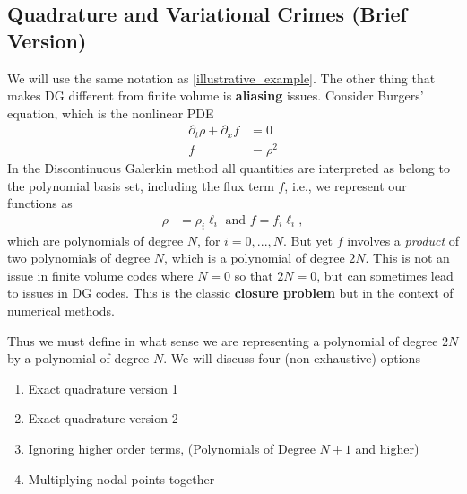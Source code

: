 \documentclass{report}
\numberwithin{equation}{section}
\begin{document}
\subsection{Quadrature and Variational Crimes (Brief Version)}
\label{aliasing_section}
We will use the same notation as \ref{illustrative_example}. The other thing that makes DG different from finite volume is \textbf{aliasing} issues.
Consider Burgers' equation, which is the nonlinear PDE
\begin{align}
    \partial_t \rho + \partial_x f &= 0 \\
    f &= \rho^2
\end{align}
In the Discontinuous Galerkin method all quantities are interpreted as belong to the polynomial basis set, including the flux term $f$, i.e., we represent our functions as
\begin{align}
    \rho &= \rho_i \ell_i \text{ and } 
    f = f_i \ell_i ,
\end{align}
which are polynomials of degree $N$, for $i = 0, ..., N$. But yet $f$ involves a \textit{product} of two polynomials of degree $N$, which is a polynomial of degree $2N$. This is not an issue in finite volume codes where $N = 0$ so that $2N = 0$, but can sometimes lead to issues in DG codes. This is the classic \textbf{closure problem} but in the context of numerical methods. 

Thus we must define in what sense we are representing a polynomial of degree $2N$ by a polynomial of degree $N$. We will discuss four (non-exhaustive) options
\begin{enumerate}
    \item Exact quadrature version 1
    \item Exact quadrature version 2
    \item Ignoring higher order terms, (Polynomials of Degree $N+1$ and higher) 
    \item Multiplying nodal points together
\end{enumerate}
\end{document}
